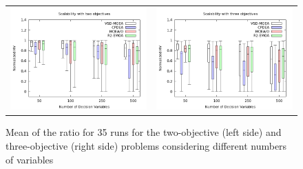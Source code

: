 \begin{figure}[h]
\centering
\begin{tabular}{c c}
\includegraphics[scale=0.28]{Images/scalability_2obj.png} & \includegraphics[scale=0.28]{Images/scalability_3obj.png}
\end{tabular}
\caption{Mean of the \HV{} ratio for 35 runs for the two-objective (left side) and three-objective (right side) problems considering different numbers of variables}\label{fig:variable-decision-scalability}
\end{figure}

